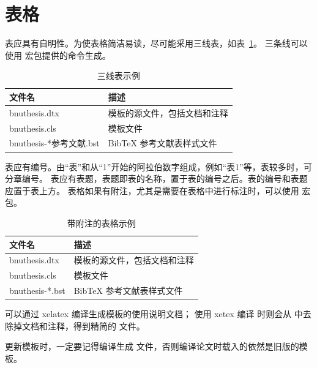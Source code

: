 \section{表格}

表应具有自明性。为使表格简洁易读，尽可能采用三线表，如表~\ref{tab:three-line}。
三条线可以使用  宏包提供的命令生成。

\begin{table}
  \centering
  \caption{三线表示例}
  \label{tab:three-line}
  \begin{tabular}{ll}
    \toprule
    文件名          & 描述                         \\
    \midrule
    bnuthesis.dtx   & 模板的源文件，包括文档和注释 \\
    bnuthesis.cls   & 模板文件                     \\
    bnuthesis-*参考文献.bst & BibTeX 参考文献表样式文件    \\
    \bottomrule
  \end{tabular}
\end{table}


表应有编号。由“表”和从“1”开始的阿拉伯数字组成，例如“表1”等，表较多时，可分章编号。
表应有表题，表题即表的名称，置于表的编号之后。表的编号和表题应置于表上方。
表格如果有附注，尤其是需要在表格中进行标注时，可以使用  宏包。

\begin{table}
  \centering
  \begin{threeparttable}[c]
    \caption{带附注的表格示例}
    \label{tab:three-part-table}
    \begin{tabular}{ll}
      \toprule
      文件名                 & 描述                         \\
      \midrule
      bnuthesis.dtx\tnote{a} & 模板的源文件，包括文档和注释 \\
      bnuthesis.cls\tnote{b} & 模板文件                     \\
      bnuthesis-*.bst        & BibTeX 参考文献表样式文件    \\
      \bottomrule
    \end{tabular}
    \begin{tablenotes}
      \item [a] 可以通过 xelatex 编译生成模板的使用说明文档；
        使用 xetex 编译  时则会从  中去除掉文档和注释，得到精简的  文件。
      \item [b] 更新模板时，一定要记得编译生成  文件，否则编译论文时载入的依然是旧版的模板。
    \end{tablenotes}
  \end{threeparttable}
\end{table}

